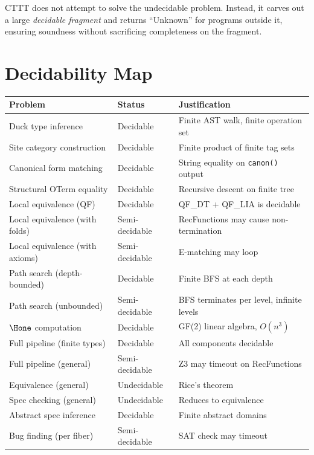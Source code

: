 CTTT does not attempt to solve the undecidable problem.  Instead, it
carves out a large \emph{decidable fragment} and returns ``Unknown''
for programs outside it, ensuring soundness without sacrificing
completeness on the fragment.

\section{Decidability Map}

\begin{center}
\small
\begin{longtable}{p{5cm} l p{5cm}}
  \toprule
  \textbf{Problem} & \textbf{Status} & \textbf{Justification} \\
  \midrule
  \endhead
  Duck type inference &
    Decidable &
    Finite AST walk, finite operation set \\
  Site category construction &
    Decidable &
    Finite product of finite tag sets \\
  Canonical form matching &
    Decidable &
    String equality on \texttt{canon()} output \\
  Structural OTerm equality &
    Decidable &
    Recursive descent on finite tree \\
  Local equivalence (QF) &
    Decidable &
    QF\_DT + QF\_LIA is decidable \\
  Local equivalence (with folds) &
    Semi-decidable &
    RecFunctions may cause non-termination \\
  Local equivalence (with axioms) &
    Semi-decidable &
    E-matching may loop \\
  Path search (depth-bounded) &
    Decidable &
    Finite BFS at each depth \\
  Path search (unbounded) &
    Semi-decidable &
    BFS terminates per level, infinite levels \\
  $\Hone$ computation &
    Decidable &
    GF(2) linear algebra, $O(n^3)$ \\
  Full pipeline (finite types) &
    Decidable &
    All components decidable \\
  Full pipeline (general) &
    Semi-decidable &
    Z3 may timeout on RecFunctions \\
  Equivalence (general) &
    Undecidable &
    Rice's theorem \\
  Spec checking (general) &
    Undecidable &
    Reduces to equivalence \\
  Abstract spec inference &
    Decidable &
    Finite abstract domains \\
  Bug finding (per fiber) &
    Semi-decidable &
    SAT check may timeout \\
  \bottomrule
\end{longtable}
\end{center}

